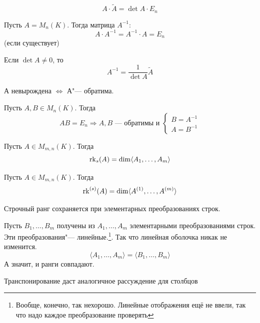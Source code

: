 \documentclass[12pt]{../../../notes}
\begin{document}
\begin{lem}\label{lem:adjointmtx}
  \[
    A\cdot\widetilde A = \det A \cdot E_n
  \]
\end{lem}

\begin{defn}\label{defn:invertmtx}
  Пусть $A = M_n(K)$. Тогда матрица $A^{-1}:$
  \[
    A\cdot A^{-1} = A^{-1} \cdot A = E_n
  \]
  (если существует)
\end{defn}

\begin{imp}
  Если $\det A \neq 0$, то
  \[
    A^{-1} = \frac{1}{\det A} \widetilde{A}
  \]
\end{imp}

\begin{imp}
  А невырождена $\Leftrightarrow$ А"--- обратима. 
\end{imp}

\begin{imp}
  Пусть $A,B \in M_n(K)$. Тогда 
  \[
    AB = E_n \Rightarrow A,B \text{~--- обратимы и } 
    \begin{cases}
      B = A^{-1} \\
      A = B^{-1}
    \end{cases}
  \]
\end{imp}

\begin{defn}\label{defn:rowrank}
  Пусть $A\in M_{m,n}(K)$. Тогда \[
    \operatorname{rk}_s (A) = \dim \langle A_1, \dotsc , A_m \rangle
  \]
\end{defn}

\begin{defn}\label{defn:colrank}
  Пусть $A\in M_{m,n}(K)$. Тогда \[
    \operatorname{rk}^{(s)} (A) = \dim \langle A^{(1)}, \dotsc , A^{(m)} \rangle
  \]
\end{defn}

\begin{lem}\label{lem:rowranktransf}
  Строчный ранг сохраняется при элементарных преобразованиях строк.
\end{lem}
\begin{itlproof}
  Пусть $B_1, \dotsc , B_m$ получены из $A_1, \dotsc , A_m$ элементарными преобразованиями строк.
  Эти преобразования"--- линейные.\footnote{Вообще, конечно, так нехорошо. Линейные отображения 
  ещё не ввели, так что надо каждое преобразование проверять}.
  Так что линейная оболочка никак не изменится. 
  \[
    \langle A_1, \dotsc , A_m\rangle = \langle B_1, \dotsc , B_m\rangle
  \]
  А значит, и ранги совпадают.
\end{itlproof}
Транспонирование даст аналогичное рассуждение для столбцов
\end{document}
